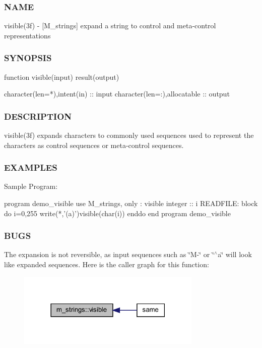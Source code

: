\subsubsection*{N\+A\+ME}

visible(3f) -\/ \mbox{[}M\+\_\+strings\mbox{]} expand a string to control and meta-\/control representations 

\subsubsection*{S\+Y\+N\+O\+P\+S\+IS}

\begin{DoxyVerb}function visible(input) result(output)

 character(len=*),intent(in)           :: input
 character(len=:),allocatable          :: output
\end{DoxyVerb}
 \subsubsection*{D\+E\+S\+C\+R\+I\+P\+T\+I\+ON}

\begin{DoxyVerb} visible(3f) expands characters to commonly used sequences used to represent the characters
 as control sequences or meta-control sequences.
\end{DoxyVerb}


\subsubsection*{E\+X\+A\+M\+P\+L\+ES}

\begin{DoxyVerb}Sample Program:

 program demo_visible
 use M_strings, only : visible
 integer :: i
    READFILE: block
       do i=0,255
          write(*,'(a)')visible(char(i))
       enddo
 end program demo_visible
\end{DoxyVerb}
 \subsubsection*{B\+U\+GS}

The expansion is not reversible, as input sequences such as \char`\"{}\+M-\/\char`\"{} or \char`\"{}$^\wedge$a\char`\"{} will look like expanded sequences. Here is the caller graph for this function\+:
\nopagebreak
\begin{figure}[H]
\begin{center}
\leavevmode
\includegraphics[width=249pt]{namespacem__strings_a791e24ceb690010fd42a6c1f48311b55_icgraph}
\end{center}
\end{figure}


